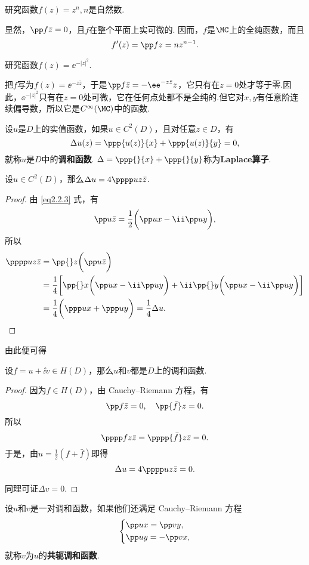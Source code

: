 \begin{example}
研究函数$f(z)=z^n,n$是自然数.
\end{example}
\begin{solution}
  显然，$\pp f{\bar z}=0$，且$f$在整个平面上实可微的. 因而，$f$是$\MC$上的全纯函数，而且
  \[f'(z)=\pp fz=nz^{n-1}.\]
\end{solution}

\begin{example}
研究函数$f(z)=\ee^{-|z|^2}$.
\end{example}
\begin{solution}
把$f$写为$f(z)=\ee^{-z\bar z}$，于是$\pp f{\bar z}=-\ee^{-z\bar z}z$，它只有在$z=0$处才等于零.因此，$\ee^{-|z|^2}$只有在$z=0$处可微，它在任何点处都不是全纯的.但它对$x,y$有任意阶连续偏导数，所以它是$C^\infty(\MC)$中的函数.
\end{solution}

\begin{definition}\label{def2.2.7}
  设$u$是$D$上的实值函数，如果$u\in C^2(D)$，且对任意$z\in D$，有
  \[\Delta u(z)=\ppp{u(z)}{x}+\ppp{u(z)}{y}=0,\]
就称$u$是$D$中的\textbf{调和函数}. $\Delta =\ppp{}{x}+\ppp{}{y}$称为\textbf{Laplace算子}.
\end{definition}

\begin{prop}\label{prop2.2.8}
设$u\in C^2(D)$，那么$\Delta u=4\pppp uz{\bar z}$.
\end{prop}
\begin{proof}
由 \eqref{eq2.2.3} 式，有
\[\pp u{\bar z}=\frac12\bigg(\pp ux-\ii\pp uy\bigg),\]
所以
\begin{align*}
\pppp uz{\bar z}&=\pp {}z\bigg(\pp u{\bar z}\bigg)\\
&=\frac14\bigg[\pp{}x\bigg(\pp ux-\ii \pp uy\bigg)+\ii\pp{}y\bigg(\pp ux-\ii\pp uy\bigg)\bigg]\\
&=\frac14\bigg(\ppp ux+\ppp uy\bigg)=\frac14\Delta u.
\end{align*}
\end{proof}

由此便可得
\begin{theorem}\label{thm2.2.9}
  设$f=u+\ii v\in H(D)$，那么$u$和$v$都是$D$上的调和函数.
\end{theorem}
\begin{proof}
因为$f\in H(D)$，由 Cauchy--Riemann 方程，有
\[\pp f{\bar z}=0,\quad \pp{\bar f}z=0.\]
所以
\[\pppp fz{\bar z}=\pppp{\bar f}z{\bar z}=0.\]
于是，由$u=\frac12(f+\bar f)$即得
\[\Delta u=4\pppp uz{\bar z}=0.\]

同理可证$\Delta v=0$.
\end{proof}
\begin{definition}\label{def2.2.10}
设$u$和$v$是一对调和函数，如果他们还满足 Cauchy--Riemann 方程
\[\left\{\begin{aligned}
&\pp ux=\pp vy,\\
&\pp uy=-\pp vx,
\end{aligned}\right.\]
就称$v$为$u$的\textbf{共轭调和函数}.
\end{definition}

